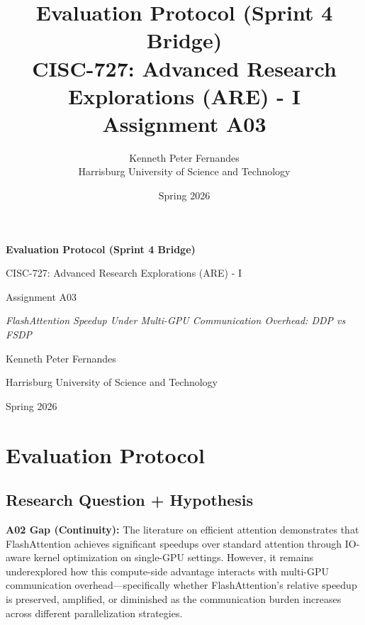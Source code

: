 \documentclass[12pt, a4paper]{article}
\title{%
    \vspace{2cm}
    \textbf{Evaluation Protocol (Sprint 4 Bridge)} \\
    \vspace{0.5cm}
    \large CISC-727: Advanced Research Explorations (ARE) - I \\
    \vspace{0.3cm}
    \large Assignment A03
}
\author{%
    Kenneth Peter Fernandes \\
    \vspace{0.3cm}
    Harrisburg University of Science and Technology
}
\date{Spring 2026}
\begin{document}
\begin{titlepage}
    \centering
    \vspace*{2cm}
    {\LARGE \textbf{Evaluation Protocol (Sprint 4 Bridge)} \par}
    \vspace{1cm}
    {\large CISC-727: Advanced Research Explorations (ARE) - I \par}
    \vspace{0.5cm}
    {\large Assignment A03 \par}
    \vspace{1.5cm}
    {\large \textit{FlashAttention Speedup Under Multi-GPU Communication Overhead: DDP vs FSDP} \par}
    \vspace{1.5cm}
    {\Large Kenneth Peter Fernandes \par}
    \vspace{0.5cm}
    {\large Harrisburg University of Science and Technology \par}
    \vspace{1cm}
    {\large Spring 2026 \par}
\end{titlepage}

\section{Evaluation Protocol}

\subsection{Research Question + Hypothesis}

\textbf{A02 Gap (Continuity):} The literature on efficient attention demonstrates that FlashAttention achieves significant speedups over standard attention through IO-aware kernel optimization on single-GPU settings. However, it remains underexplored how this compute-side advantage interacts with multi-GPU communication overhead---specifically whether FlashAttention's relative speedup is preserved, amplified, or diminished as the communication burden increases across different parallelization strategies.
\end{document}
